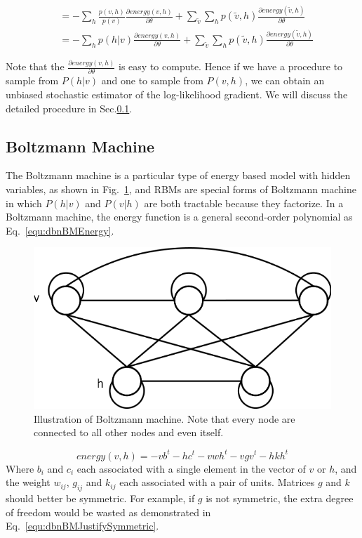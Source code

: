 \documentclass[runningheads,openany]{xhlPaper}
\begin{document}
\begin{equation}
\begin{aligned}
 & =  - \sum\limits_h {\frac{{p\left( {v,h} \right)}}{{p\left( v \right)}}\frac{{\partial energy\left( {v,h} \right)}}{{\partial \theta }}}  + \sum\limits_{\tilde v} {\sum\limits_h {p\left( {\tilde v,h} \right)\frac{{\partial energy\left( {\tilde v,h} \right)}}{{\partial \theta }}} } \\
 &=  - \sum\limits_h {p\left( {h|v} \right)\frac{{\partial energy\left( {v,h} \right)}}{{\partial \theta }}}  + \sum\limits_{\tilde v} {\sum\limits_h {p\left( {\tilde v,h} \right)\frac{{\partial energy\left( {\tilde v,h} \right)}}{{\partial \theta }}} } 
\end{aligned}
\end{equation}

Note that the $\frac{{\partial energy\left( {v,h} \right)}}{{\partial \theta }}$ is easy to compute. Hence if we have a procedure to sample from $P\left(h|v\right)$ and one to sample from $P\left(v,h\right)$, we can obtain an unbiased stochastic estimator of the log-likelihood gradient. We will discuss the detailed procedure in Sec.\ref{sec:dbnBM}.

\subsection{Boltzmann Machine}
\label{sec:dbnBM}
The Boltzmann machine is a particular type of energy based model with hidden variables, as shown in Fig.~\ref{fig:dbn_bm}, and RBMs are special forms of Boltzmann machine in which $P\left(h|v\right)$ and $P\left(v|h\right)$ are both tractable because they factorize. In a Boltzmann machine, the energy function is a general second-order polynomial as Eq.~\ref{equ:dbnBMEnergy}.

\begin{figure}
\centering
\includegraphics[width=0.6\linewidth]{dbn_bm}
\caption{Illustration of Boltzmann machine. Note that every node are connected to all other nodes and even itself.}
\label{fig:dbn_bm}
\end{figure}

\begin{equation}
\label{equ:dbnBMEnergy}
energy\left( {v,h} \right) =  - v{b^t} - h{c^t} - vw{h^t} - vg{v^t} - hk{h^t}
\end{equation}
Where $b_{i}$ and $c_{i}$ each associated with a single element in the vector of $v$ or $h$, and the weight $w_{ij}$, $g_{ij}$ and $k_{ij}$ each associated with a pair of units. 
Matrices $g$ and $k$ should better be symmetric. For example, if $g$ is not symmetric, the extra degree of freedom would be wasted as demonstrated in Eq.~\ref{equ:dbnBMJustifySymmetric}.
\end{document}
